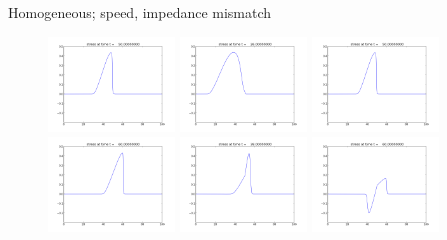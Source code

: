 \documentclass{beamer}
\begin{document}
\begin{frame}{Homogeneous; speed, impedance mismatch}
\begin{figure}
  \includegraphics[width=0.3\textwidth]{homo1.png}
  \includegraphics[width=0.3\textwidth]{sound1.png}
  \includegraphics[width=0.3\textwidth]{reflect1.png}\\
  \includegraphics[width=0.3\textwidth]{homo3.png}
  \includegraphics[width=0.3\textwidth]{sound3.png}
  \includegraphics[width=0.3\textwidth]{reflect3.png}\\

\end{figure}
\end{frame}
\end{document}
